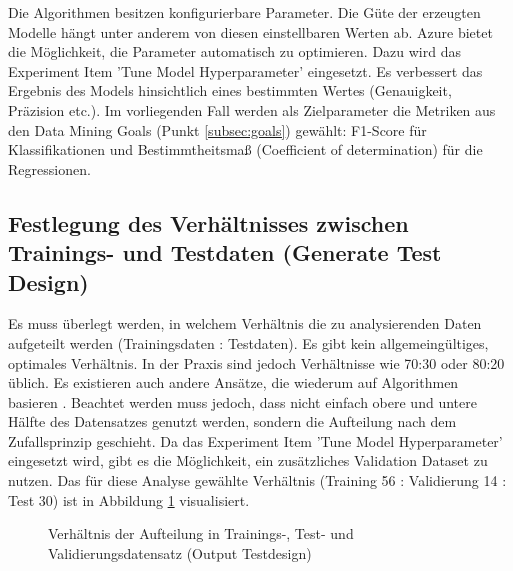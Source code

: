 Die Algorithmen besitzen konfigurierbare Parameter. Die Güte der erzeugten Modelle hängt unter anderem von diesen einstellbaren Werten ab. Azure bietet die Möglichkeit, die Parameter automatisch zu optimieren. Dazu wird das Experiment Item 'Tune Model Hyperparameter' eingesetzt. Es verbessert das Ergebnis des Models hinsichtlich eines bestimmten Wertes (Genauigkeit, Präzision etc.). Im vorliegenden Fall werden als Zielparameter die Metriken aus den Data Mining Goals (Punkt \ref{subsec:goals}) gewählt:
F1-Score für Klassifikationen und Bestimmtheitsmaß (Coefficient of determination) für die Regressionen.

\subsection{Festlegung des Verhältnisses zwischen Trainings- und Testdaten (Generate Test Design)}
Es muss überlegt werden, in welchem Verhältnis die zu analysierenden Daten aufgeteilt werden (Trainingsdaten : Testdaten). Es gibt kein allgemeingültiges, optimales Verhältnis. In der Praxis sind jedoch Verhältnisse wie 70:30 oder 80:20 üblich. Es existieren auch andere Ansätze, die wiederum auf Algorithmen basieren \citep{crowther_method_2005}. Beachtet werden muss jedoch, dass nicht einfach obere und untere Hälfte des Datensatzes genutzt werden, sondern die Aufteilung nach dem Zufallsprinzip geschieht. Da das Experiment Item 'Tune Model Hyperparameter' eingesetzt wird, gibt es die Möglichkeit, ein zusätzliches Validation Dataset zu nutzen. Das für diese Analyse gewählte Verhältnis (Training 56 : Validierung 14 : Test 30) ist in Abbildung \ref{fig:ratio} visualisiert.
\begin{figure}[H]
\centering
{}
\caption{Verhältnis der Aufteilung in Trainings-, Test- und Validierungsdatensatz (Output Testdesign)}
\label{fig:ratio}
\end{figure}

